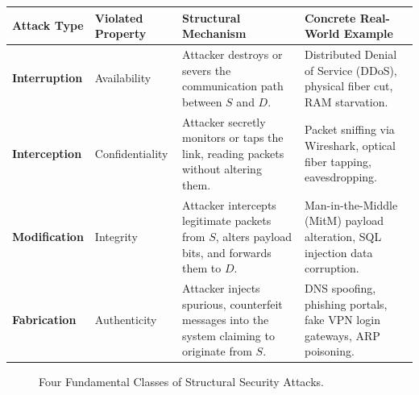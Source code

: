 \begin{center}
\begin{tabularx}{\textwidth}{>{\bfseries}l l p{3.2cm} X}
\toprule
Attack Type & Violated Property & Structural Mechanism & Concrete Real-World Example\\
\midrule
Interruption & Availability & Attacker destroys or severs the communication path between $S$ and $D$. & Distributed Denial of Service (DDoS), physical fiber cut, RAM starvation.\\
Interception & Confidentiality & Attacker secretly monitors or taps the link, reading packets without altering them. & Packet sniffing via Wireshark, optical fiber tapping, eavesdropping.\\
Modification & Integrity & Attacker intercepts legitimate packets from $S$, alters payload bits, and forwards them to $D$. & Man-in-the-Middle (MitM) payload alteration, SQL injection data corruption.\\
Fabrication & Authenticity & Attacker injects spurious, counterfeit messages into the system claiming to originate from $S$. & DNS spoofing, phishing portals, fake VPN login gateways, ARP poisoning.\\
\bottomrule
\end{tabularx}
\end{center}

\begin{figure}[H]
\centering
{}
\caption{Four Fundamental Classes of Structural Security Attacks.}
\end{figure}

